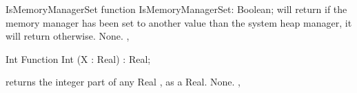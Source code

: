 \documentclass{report}
\begin{document}
\begin{function}{IsMemoryManagerSet}
\Declaration
function  IsMemoryManagerSet: Boolean;
\Description
{} will return  if the memory manager has
been set to another value than the system heap manager, it will return
 otherwise.
\Errors
None.
\SeeAlso
{}, 
\end{function}

\begin{function}{Int}
\Declaration
Function Int (X : Real) : Real;

\Description
{} returns the integer part of any Real , as a Real.
\Errors
None.
\SeeAlso
{}, 
\end{function}

\end{document}
